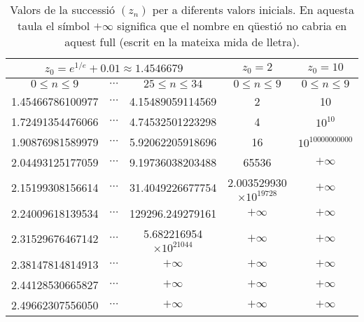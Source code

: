 \documentclass[11pt,a4paper]{article}
\theoremstyle{definition}
\begin{document}
\begin{table}[ht]
    \def\arraystretch{1}
    \centering
    \begin{tabular}{|c|c|c||c||c|}
        \hline
        \multicolumn{3}{|c||}{$z_0=e^{1/e}+0.01\approx1.4546679$} & $z_0=2$  & $z_0=10$                                                                           \\
        \hline
        $0\leq n\leq 9$                                           & $\cdots$ & $25\leq n\leq 34$             & $0\leq n\leq 9$               & $0\leq n\leq 9$    \\
        \hline
        \hline
        1.45466786100977                                          & $\cdots$ & 4.15489059114569              & 2                             & 10                 \\
        \hline
        1.72491354476066                                          & $\cdots$ & 4.74532501223298              & 4                             & $10^{10}$          \\
        \hline
        1.90876981589979                                          & $\cdots$ & 5.92062205918696              & 16                            & $10^{10000000000}$ \\
        \hline
        2.04493125177059                                          & $\cdots$ & 9.19736038203488              & 65536                         & $+\infty$          \\
        \hline
        2.15199308156614                                          & $\cdots$ & 31.4049226677754              & 2.003529930$\times10^{19728}$ & $+\infty$          \\
        \hline
        2.24009618139534                                          & $\cdots$ & 129296.249279161              & $+\infty$                     & $+\infty$          \\
        \hline
        2.31529676467142                                          & $\cdots$ & 5.682216954$\times10^{21044}$ & $+\infty$                     & $+\infty$          \\
        \hline
        2.38147814814913                                          & $\cdots$ & $+\infty$                     & $+\infty$                     & $+\infty$          \\
        \hline
        2.44128530665827                                          & $\cdots$ & $+\infty$                     & $+\infty$                     & $+\infty$          \\
        \hline
        2.49662307556050                                          & $\cdots$ & $+\infty$                     & $+\infty$                     & $+\infty$          \\
        \hline
    \end{tabular}
    \caption{Valors de la successió $(z_n)$ per a diferents valors inicials. En aquesta taula el símbol $+\infty$ significa que el nombre en qüestió no cabria en aquest full (escrit en la mateixa mida de lletra).}
    \label{taula2}
\end{table}
\appendix
\end{document}
